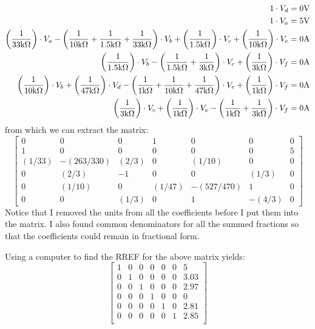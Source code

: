 \begin{align*}
1\cdot V_d &= 0\textnormal{V} 
\\
1\cdot V_a &= 5\textnormal{V} 
\\
\left(\frac{1}{33\textnormal{k}\Omega}\right)\cdot V_a - \left(\frac{1}{10\textnormal{k}\Omega}+\frac{1}{1.5\textnormal{k}\Omega}+\frac{1}{33\textnormal{k}\Omega}\right)\cdot V_b +\left(\frac{1}{1.5\textnormal{k}\Omega}\right)\cdot V_c +\left(\frac{1}{10\textnormal{k}\Omega}\right)\cdot V_e &= 0\textnormal{A} 
\\
\left(\frac{1}{1.5\textnormal{k}\Omega}\right)\cdot V_b -\left(\frac{1}{1.5\textnormal{k}\Omega}+\frac{1}{3\textnormal{k}\Omega}\right)\cdot V_c + \left(\frac{1}{3\textnormal{k}\Omega}\right)\cdot V_f &= 0\textnormal{A} 
\\
\left(\frac{1}{10\textnormal{k}\Omega}\right)\cdot V_b +\left(\frac{1}{47\textnormal{k}\Omega}\right)\cdot V_d -\left(\frac{1}{1\textnormal{k}\Omega}+\frac{1}{10\textnormal{k}\Omega}+\frac{1}{47\textnormal{k}\Omega}\right)\cdot V_e +\left(\frac{1}{1\textnormal{k}\Omega}\right)\cdot V_f &= 0\textnormal{A} 
\\
\left(\frac{1}{3\textnormal{k}\Omega}\right) \cdot V_c + \left(\frac{1}{1\textnormal{k}\Omega}\right)\cdot V_e -\left(\frac{1}{1\textnormal{k}\Omega}+\frac{1}{3\textnormal{k}\Omega}\right)\cdot V_f &= 0\textnormal{A}
\end{align*}
from which we can extract the matrix:
$$
\begin{bmatrix}
    0 & 0 & 0 & 1 & 0 & 0 & 0 \\
    1 & 0 & 0 & 0 & 0 & 0 & 5 \\
	(1/33) & -(263/330) & (2/3) & 0 & (1/10) & 0 & 0 \\
	0 & (2/3) & -1 & 0 & 0 & (1/3) & 0 \\
	0 & (1/10) & 0 & (1/47) & -(527/470) & 1 & 0 \\
	0 & 0 & (1/3) & 0 & 1 & -(4/3) & 0
\end{bmatrix} 
$$
Notice that I removed the units from all the coefficients before I put them into the matrix. I also found common denominators for all the summed fractions so that the coefficients could remain in fractional form.
\par
Using a computer to find the RREF for the above matrix yields:
$$
\begin{bmatrix}
    1 & 0 & 0 & 0 & 0 & 0 & 5 \\
    0 & 1 & 0 & 0 & 0 & 0 & 3.03 \\
	0 & 0 & 1 & 0 & 0 & 0 & 2.97 \\
	0 & 0 & 0 & 1 & 0 & 0 & 0 \\
	0 & 0 & 0 & 0 & 1 & 0 & 2.81 \\
	0 & 0 & 0 & 0 & 0 & 1 & 2.85 \\
\end{bmatrix} 
$$
